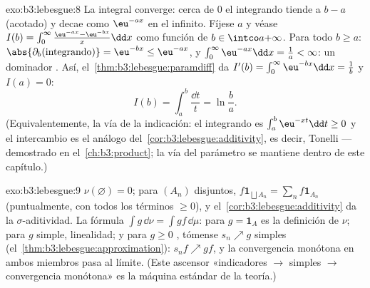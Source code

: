 \begin{solution}{exo:b3:lebesgue:8}
La integral converge: cerca de $0$ el integrando tiende a $b - a$
(acotado) y decae como $\eu^{-ax}$ en el infinito. Fíjese $a$ y véase
$I(b) = \int_0^\infty\frac{\eu^{-ax} -
\eu^{-bx}}x\dd x$ como función de $b \in \intco a{+\infty}$. Para todo
$b \geq a$: $\abs{\partial_b(\text{integrando})} =
\eu^{-bx} \leq \eu^{-ax}$, y $\int_0^\infty\eu^{-ax}\dd x =
\frac1a < \infty$: un dominador .
Así, el~\cref{thm:b3:lebesgue:paramdiff} da $I'(b) =
\int_0^\infty\eu^{-bx}\dd x = \frac1b$ y $I(a) = 0$:
\[
I(b) = \int_a^b\frac{\dd t}t = \ln\frac ba .
\]
(Equivalentemente, la vía de la indicación: el integrando es
$\int_a^b\eu^{-xt}\dd t \geq 0$ y el intercambio es el análogo
del~\cref{cor:b3:lebesgue:additivity}, es decir, Tonelli --- demostrado
en el~\cref{ch:b3:product}; la vía del parámetro se mantiene dentro de
este capítulo.)
\end{solution}

\begin{solution}{exo:b3:lebesgue:9}
$\nu(\varnothing) = 0$; para $(A_n)$ disjuntos, $f\mathbf
1_{\bigsqcup A_n} = \sum_nf\mathbf 1_{A_n}$ (puntualmente, con todos los
términos $\geq 0$), y el~\cref{cor:b3:lebesgue:additivity} da la
$\sigma$-aditividad. La fórmula $\int g\,\dd\nu = \int
gf\,\dd\mu$: para $g = \mathbf 1_A$ es la definición de $\nu$; para $g$
simple, linealidad; y para $g \geq 0$
, tómense $s_n \nearrow g$
simples (el~\cref{thm:b3:lebesgue:approximation}): $s_nf \nearrow gf$, y
la convergencia monótona en ambos miembros pasa al límite. (Este
ascensor «indicadores $\to$ simples $\to$ convergencia monótona» es la
máquina estándar de la teoría.)
\end{solution}

